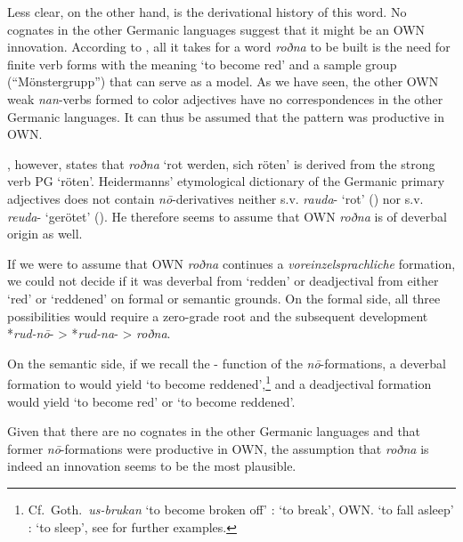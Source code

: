 \documentclass[output=paper,colorlinks,citecolor=brown]{langscibook}
\begin{document}
Less clear, on the other hand, is the derivational history of this word. No cognates in the other Germanic languages suggest that it might be an OWN innovation. According to \citet[100]{Wessen1965}, all it takes for a word \textit{roðna} to be built is the need for finite verb forms with the meaning ‘to become red’ and a sample group (“Mönstergrupp”) that can serve as a model. As we have seen, the other OWN weak \textit{nan}-verbs formed to color adjectives have no correspondences in the other Germanic languages. It can thus be assumed that the pattern was productive in OWN.

\citet[379]{Seebold1970}, however, states that \textit{roðna} ‘rot werden, sich röten’ is derived from the strong verb PG  ‘röten’. Heidermanns’ etymological dictionary of the Germanic primary adjectives does not contain \textit{nō}-derivatives neither s.v. \textit{rauda}- ‘rot’ () nor s.v. \textit{reuda}- ‘gerötet’ (). He therefore seems to assume that OWN \textit{roðna} is of deverbal origin as well.

If we were to assume that OWN \textit{roðna} continues a \textit{voreinzelsprachliche} formation, we could not decide if it was deverbal from  ‘redden’ or deadjectival  from either  ‘red’ or  ‘reddened’ on formal or semantic grounds. On the formal side, all three possibilities would require a zero-grade root and the subsequent development *\textit{rud-nō}- > *\textit{rud-na}- > \textit{roðna}. 

On the semantic side, if we recall the - function of the \textit{nō}-formations, a deverbal formation to  would yield ‘to become reddened’,\footnote{Cf.\ Goth.\ \textit{us-brukan}  ‘to become broken off’ :  ‘to break’, OWN.  ‘to fall asleep’ :  ‘to sleep’, see \citet[253]{KraheMeid1969} for further examples.} and a deadjectival  formation would yield ‘to become red’ or ‘to become reddened’.

Given that there are no cognates in the other Germanic languages and that former \textit{nō}-formations were productive in OWN, the assumption that \textit{roðna} is indeed an innovation seems to be the most plausible.
\end{document}
